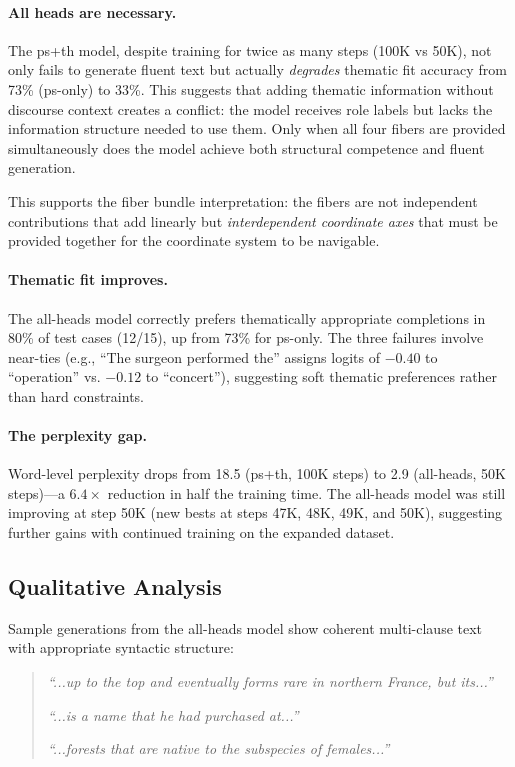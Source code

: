 \documentclass[11pt]{article}
\begin{document}
\paragraph{All heads are necessary.}
The ps+th model, despite training for twice as many steps (100K vs 50K), 
not only fails to generate fluent text but actually \emph{degrades} 
thematic fit accuracy from 73\% (ps-only) to 33\%. This suggests that 
adding thematic information without discourse context creates a conflict: 
the model receives role labels but lacks the information structure needed 
to use them. Only when all four fibers are provided simultaneously does 
the model achieve both structural competence and fluent generation.

This supports the fiber bundle interpretation: the fibers are not 
independent contributions that add linearly but \emph{interdependent 
coordinate axes} that must be provided together for the coordinate 
system to be navigable.

\paragraph{Thematic fit improves.}
The all-heads model correctly prefers thematically appropriate completions 
in 80\% of test cases (12/15), up from 73\% for ps-only. The three 
failures involve near-ties (e.g., ``The surgeon performed the'' assigns 
logits of $-0.40$ to ``operation'' vs. $-0.12$ to ``concert''), suggesting 
soft thematic preferences rather than hard constraints.

\paragraph{The perplexity gap.}
Word-level perplexity drops from 18.5 (ps+th, 100K steps) to 2.9 
(all-heads, 50K steps)---a $6.4\times$ reduction in half the training 
time. The all-heads model was still improving at step 50K (new bests at 
steps 47K, 48K, 49K, and 50K), suggesting further gains with continued 
training on the expanded dataset.

\subsection{Qualitative Analysis}

Sample generations from the all-heads model show coherent multi-clause 
text with appropriate syntactic structure:

\begin{quote}
\small
\emph{``...up to the top and eventually forms rare in northern France, 
but its...''}

\emph{``...is a name that he had purchased at...''}

\emph{``...forests that are native to the subspecies of females...''}
\end{quote}
\end{document}
